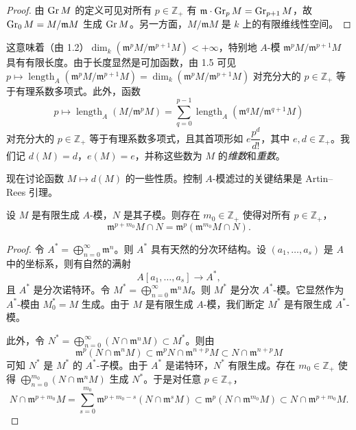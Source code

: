 \begin{proof}
由 $\operatorname{Gr} M$ 的定义可见对所有 $p\in\mathbb{Z}_+$ 有 $\mathfrak{m}\cdot \operatorname{Gr}_p M=\operatorname{Gr}_{p+1}M$，故 $\operatorname{Gr}_0 M=M/\mathfrak{m}M$ 生成 $\operatorname{Gr} M$。另一方面，$M/\mathfrak{m}M$ 是 $k$ 上的有限维线性空间。
\end{proof}

这意味着（由 1.2）$\dim_k(\mathfrak{m}^p M/\mathfrak{m}^{p+1}M)<+\infty$，特别地 $A$-模 $\mathfrak{m}^p M/\mathfrak{m}^{p+1}M$ 具有有限长度。由于长度显然是可加函数，由 1.5 可见 $p\longmapsto \operatorname{length}_A(\mathfrak{m}^p M/\mathfrak{m}^{p+1}M)=\dim_k(\mathfrak{m}^p M/\mathfrak{m}^{p+1}M)$ 对充分大的 $p\in\mathbb{Z}_+$ 等于有理系数多项式。此外，函数
$$p\longmapsto \operatorname{length}_A(M/\mathfrak{m}^p M)=\sum_{q=0}^{p-1}\operatorname{length}_A(\mathfrak{m}^q M/\mathfrak{m}^{q+1}M)$$
对充分大的 $p\in\mathbb{Z}_+$ 等于有理系数多项式，且其首项形如 $e\dfrac{p^d}{d!}$，其中 $e,d\in\mathbb{Z}_+$。我们记 $d(M)=d$，$e(M)=e$，并称这些数为 $M$ 的\emph{维数}和\emph{重数}。

现在讨论函数 $M\longmapsto d(M)$ 的一些性质。控制 $A$-模滤过的关键结果是 Artin--Rees 引理。

\begin{theorem}
设 $M$ 是有限生成 $A$-模，$N$ 是其子模。则存在 $m_0\in\mathbb{Z}_+$ 使得对所有 $p\in\mathbb{Z}_+$，
$$\mathfrak{m}^{p+m_0}M\cap N=\mathfrak{m}^p(\mathfrak{m}^{m_0}M\cap N).$$
\end{theorem}

\begin{proof}
令 $A^*=\bigoplus_{n=0}^{\infty}\mathfrak{m}^n$。则 $A^*$ 具有天然的分次环结构。设 $(a_1,\dots,a_s)$ 是 $A$ 中的坐标系，则有自然的满射
$$A[a_1,\dots,a_s]\longrightarrow A^*,$$
且 $A^*$ 是分次诺特环。令 $M^*=\bigoplus_{n=0}^{\infty}\mathfrak{m}^n M$。则 $M^*$ 是分次 $A^*$-模。它显然作为 $A^*$-模由 $M^*_0=M$ 生成。由于 $M$ 是有限生成 $A$-模，我们断定 $M^*$ 是有限生成 $A^*$-模。

此外，令 $N^*=\bigoplus_{n=0}^{\infty}(N\cap \mathfrak{m}^n M)\subset M^*$。则由
$$\mathfrak{m}^p(N\cap \mathfrak{m}^n M)\subset \mathfrak{m}^p N\cap \mathfrak{m}^{n+p}M\subset N\cap \mathfrak{m}^{n+p}M$$
可知 $N^*$ 是 $M^*$ 的 $A^*$-子模。由于 $A^*$ 是诺特环，$N^*$ 有限生成。存在 $m_0\in\mathbb{Z}_+$ 使得 $\bigoplus_{n=0}^{m_0}(N\cap\mathfrak{m}^n M)$ 生成 $N^*$。于是对任意 $p\in\mathbb{Z}_+$，
$$N\cap\mathfrak{m}^{p+m_0}M=\sum_{s=0}^{m_0}\mathfrak{m}^{p+m_0-s}(N\cap\mathfrak{m}^s M)\subset \mathfrak{m}^p(N\cap\mathfrak{m}^{m_0}M)\subset N\cap\mathfrak{m}^{p+m_0}M.$$
\end{proof}

